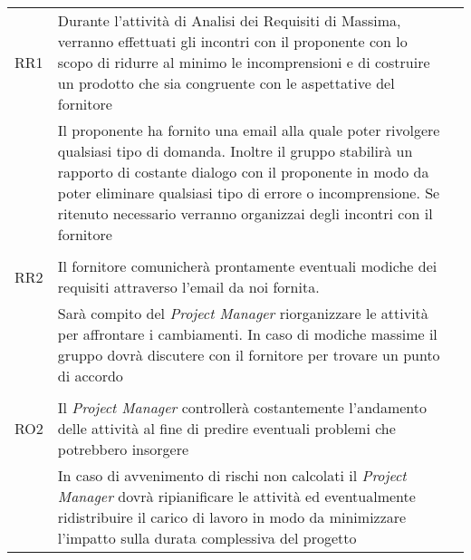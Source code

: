 \begin{table}[H]
\begin{tabular}{l|l|l}
		RR1     & Durante l'attività di Analisi dei Requisiti di Massima, verranno effettuati gli incontri con il proponente con lo scopo di ridurre al minimo le incomprensioni e di costruire un prodotto che sia congruente con le aspettative del fornitore\\  & Il proponente ha fornito una email alla quale poter rivolgere qualsiasi tipo di domanda. Inoltre il gruppo stabilirà un rapporto di costante dialogo con il proponente in modo da poter eliminare qualsiasi tipo di errore o incomprensione. Se ritenuto necessario verranno organizzai degli incontri con il fornitore\\                                                                                                                                                               \\
		RR2     & Il fornitore comunicherà prontamente eventuali modiche dei requisiti attraverso l'email da noi fornita. \\                                                                                                                                       & Sarà compito del \emph{Project Manager} riorganizzare le attività per affrontare i cambiamenti. In caso di modiche massime il gruppo dovrà discutere con il fornitore per trovare un punto di accordo\\                                                                                                                                                                                                                                                                \\
		RO2     & Il \emph{Project Manager} controllerà costantemente l'andamento delle attività al fine di predire eventuali problemi che potrebbero insorgere\\                                                                                   & In caso di avvenimento di rischi non calcolati il \emph{Project Manager} dovrà ripianificare le attività ed eventualmente ridistribuire il carico di lavoro in modo da minimizzare l'impatto sulla durata complessiva del progetto\\                                                                                                                                                                                                                                  
	\end{tabular}
\end{table}





